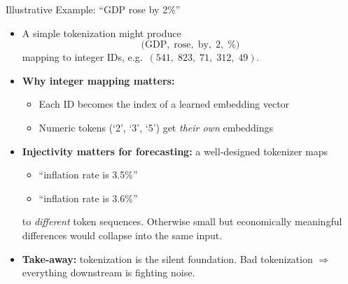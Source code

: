 \begin{frame}{Illustrative Example: ``GDP rose by 2\%''}
\begin{itemize}
\item A simple tokenization might produce
\[
   \text{(GDP},\; \text{rose},\; \text{by},\; \text{2},\; \%\text{)}
\]
mapping to integer IDs, e.g.\ $(541,\; 823,\; 71,\; 312,\; 49)$.

\medskip
\item \textbf{Why integer mapping matters:}
\begin{itemize}
    \item Each ID becomes the index of a learned embedding vector
    \item Numeric tokens (`2', `3', `5') get \emph{their own} embeddings
\end{itemize}

\medskip
\item \textbf{Injectivity matters for forecasting:} a well-designed tokenizer maps
\begin{itemize}
    \item ``inflation rate is 3.5\%''
    \item ``inflation rate is 3.6\%''
\end{itemize}
to \emph{different} token sequences. Otherwise small but economically meaningful differences would collapse into the same input.

\medskip
\item \textbf{Take-away:} tokenization is the silent foundation. Bad tokenization $\Rightarrow$ everything downstream is fighting noise.
\end{itemize}
\end{frame}

